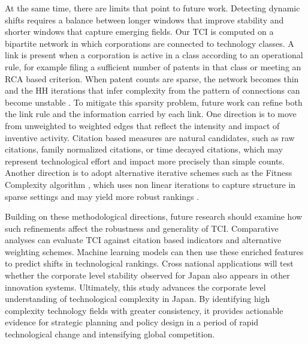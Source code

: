 At the same time, there are limits that point to future work. Detecting dynamic shifts requires a balance between longer windows that improve stability and shorter windows that capture emerging fields. Our TCI is computed on a bipartite network in which corporations are connected to technology classes. A link is present when a corporation is active in a class according to an operational rule, for example filing a sufficient number of patents in that class or meeting an RCA based criterion. When patent counts are sparse, the network becomes thin and the HH iterations that infer complexity from the pattern of connections can become unstable \cite{PintarEssletzbichler2022}.
To mitigate this sparsity problem, future work can refine both the link rule and the information carried by each link. One direction is to move from unweighted to weighted edges that reflect the intensity and impact of inventive activity. Citation based measures are natural candidates, such as raw citations, family normalized citations, or time decayed citations, which may represent technological effort and impact more precisely than simple counts. Another direction is to adopt alternative iterative schemes such as the Fitness Complexity algorithm \cite{Tacchella2012}, which uses non linear iterations to capture structure in sparse settings and may yield more robust rankings \cite{Wu2016,Albeaik2017}.

Building on these methodological directions, future research should examine how such refinements affect the robustness and generality of TCI.
Comparative analyses can evaluate TCI against citation based indicators and alternative weighting schemes.
Machine learning models can then use these enriched features to predict shifts in technological rankings.
Cross national applications will test whether the corporate level stability observed for Japan also appears in other innovation systems.
Ultimately, this study advances the corporate level understanding of technological complexity in Japan.
By identifying high complexity technology fields with greater consistency, it provides actionable evidence for strategic planning and policy design in a period of rapid technological change and intensifying global competition.
